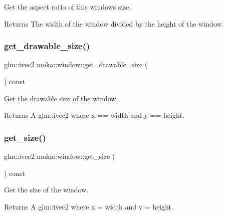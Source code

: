 Get the aspect ratio of this window\textquotesingle{}s size. 

\begin{DoxyReturn}{Returns}
The width of the window divided by the height of the window. 
\end{DoxyReturn}
\mbox{\label{classmoka_1_1window_af4c71117b5eddc347d5172bc26f3cb73}} 
\subsubsection{\texorpdfstring{get\_drawable\_size()}{get\_drawable\_size()}}
{\footnotesize\ttfamily glm\+::ivec2 moka\+::window\+::get\+\_\+drawable\+\_\+size (\begin{DoxyParamCaption}{ }\end{DoxyParamCaption}) const}



Get the drawable size of the window. 

\begin{DoxyReturn}{Returns}
A glm\+::ivec2 where x == width and y == height. 
\end{DoxyReturn}
\mbox{\label{classmoka_1_1window_a496c3e765a752526d2bfea47891846ab}} 
\subsubsection{\texorpdfstring{get\_size()}{get\_size()}}
{\footnotesize\ttfamily glm\+::ivec2 moka\+::window\+::get\+\_\+size (\begin{DoxyParamCaption}{ }\end{DoxyParamCaption}) const}



Get the size of the window. 

\begin{DoxyReturn}{Returns}
A glm\+::ivec2 where x = width and y = height. 
\end{DoxyReturn}
\mbox{\label{classmoka_1_1window_aa01c0e44f28b0253ecf376c999e5f74f}} 
